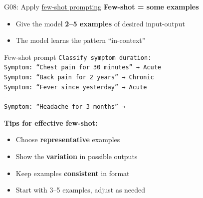 \documentclass[aspectratio=169, 10pt]{beamer}
\begin{document}
\begin{frame}{G08: Apply \href{https://en.wikipedia.org/wiki/Few-shot_learning}{few-shot prompting}}
    \textbf{Few-shot = some examples}
    
    \begin{itemize}
        \item Give the model \textbf{2--5 examples} of desired input-output
        \item The model learns the pattern ``in-context''
    \end{itemize}
    
    \vspace{0.3cm}
    \begin{block}{Few-shot prompt}
        \small
        \texttt{Classify symptom duration:} \\
        \texttt{Symptom: ``Chest pain for 30 minutes'' → Acute} \\
        \texttt{Symptom: ``Back pain for 2 years'' → Chronic} \\
        \texttt{Symptom: ``Fever since yesterday'' → Acute} \\
        \texttt{---} \\
        \texttt{Symptom: ``Headache for 3 months'' →}
    \end{block}
    
    \vspace{0.3cm}
    \textbf{Tips for effective few-shot:}
    \begin{itemize}
        \item Choose \textbf{representative} examples
        \item Show the \textbf{variation} in possible outputs
        \item Keep examples \textbf{consistent} in format
        \item Start with 3--5 examples, adjust as needed
    \end{itemize}
\end{frame}
\end{document}
